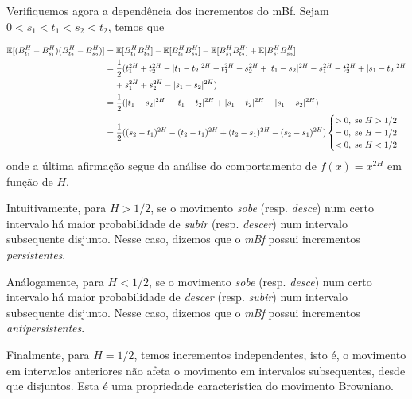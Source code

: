 \documentclass{article}
\begin{document}
\vspace{0.5cm}

Verifiquemos agora a dependência dos incrementos do mBf. Sejam $0<s_1<t_1<s_2<t_2$, temos que 

\begin{align*}
    \mathbb{E}[(B^H_{t_1}-B^H_{s_1})(B^H_{t_2}-B^H_{s_2})]&=\mathbb{E}[B^H_{t_1}B^H_{t_2}]-\mathbb{E}[B^H_{t_1}B^H_{s_2}]-\mathbb{E}[B^H_{s_1}B^H_{t_2}]+\mathbb{E}[B^H_{s_1}B^H_{s_2}]\\
    &=\frac{1}{2}(t_1^{2H}+t_2^{2H}-|t_1-t_2|^{2H}-t_1^{2H}-s_2^{2H}+|t_1-s_2|^{2H}-s_1^{2H}-t_2^{2H}+|s_1-t_2|^{2H}\\
    &\hspace{0.4cm}  +s_1^{2H}+s_2^{2H}-|s_1-s_2|^{2H})\\
    &=\frac{1}{2}(|t_1-s_2|^{2H}-|t_1-t_2|^{2H}+|s_1-t_2|^{2H}-|s_1-s_2|^{2H})\\
    &=\frac{1}{2}((s_2-t_1)^{2H}-(t_2-t_1)^{2H}+(t_2-s_1)^{2H}-(s_2-s_1)^{2H})
    \begin{cases}
        >0, \text{ se } H >1/2 \\
        =0, \text{ se } H =1/2 \\
        <0, \text{ se } H<1/2
    \end{cases}
\end{align*}
onde a última afirmação segue da análise do comportamento de $f(x)=x^{2H}$ em função de $H$.

\vspace{0.5cm}

Intuitivamente, para $H>1/2$, se o movimento \textit{sobe} (resp. \textit{desce}) num certo intervalo há maior probabilidade de \textit{subir} (resp. \textit{descer}) num intervalo subsequente disjunto. Nesse caso, dizemos que o \textit{mBf} possui incrementos \textit{persistentes}.

Análogamente, para $H<1/2$, se o movimento \textit{sobe} (resp. \textit{desce}) num certo intervalo há maior probabilidade de \textit{descer} (resp. \textit{subir}) num intervalo subsequente disjunto. Nesse caso, dizemos que o \textit{mBf} possui incrementos \textit{antipersistentes}.

Finalmente, para $H=1/2$, temos incrementos independentes, isto é, o movimento em intervalos anteriores não afeta o movimento em intervalos subsequentes, desde que disjuntos. Esta é uma propriedade característica do movimento Browniano.
\end{document}
